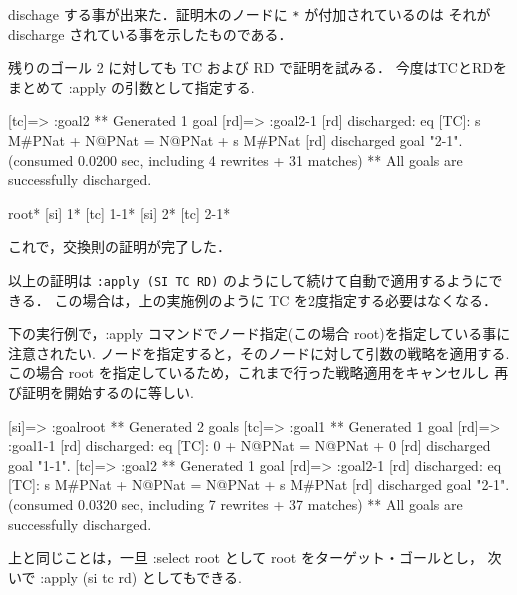 \documentclass[a4paper,oneside,10pt,here]{memoir}
\newenvironment{vvtm}%
{\parskip=0pt\lineskip=0pt\begin{center}\begin{minipage}{0.8\textwidth}\begin{snugshade}}%
  {\end{snugshade}\end{minipage}\end{center}}
\begin{document}
dischage する事が出来た．証明木のノードに \verb|*| が付加されているのは
それが discharge されている事を示したものである．

残りのゴール 2 に対しても TC および RD で証明を試みる．
今度はTCとRDをまとめて :apply の引数として指定する.
\begin{vvtm}
  \begin{simplev}

[tc]=> :goal{2}
** Generated 1 goal
[rd]=> :goal{2-1}
[rd] discharged: 
  eq [TC]: s M#PNat + N@PNat = N@PNat + s M#PNat
[rd] discharged goal "2-1".
(consumed 0.0200 sec, including 4 rewrites + 31 matches)
** All goals are successfully discharged.

root*
[si]  1*
[tc]  1-1*
[si]  2*
[tc]  2-1*
  \end{simplev}
\end{vvtm}
これで，交換則の証明が完了した．

以上の証明は \verb|:apply (SI TC RD)| のようにして続けて自動で適用するようにできる．
この場合は，上の実施例のように TC を2度指定する必要はなくなる．

下の実行例で，:apply コマンドでノード指定(この場合 root)を指定している事に注意されたい.
ノードを指定すると，そのノードに対して引数の戦略を適用する.
この場合 root を指定しているため，これまで行った戦略適用をキャンセルし
再び証明を開始するのに等しい.

\begin{vvtm}
  \begin{simplev}

[si]=> :goal{root}
** Generated 2 goals
[tc]=> :goal{1}
** Generated 1 goal
[rd]=> :goal{1-1}
[rd] discharged: 
  eq [TC]: 0 + N@PNat = N@PNat + 0
[rd] discharged goal "1-1".
[tc]=> :goal{2}
** Generated 1 goal
[rd]=> :goal{2-1}
[rd] discharged: 
  eq [TC]: s M#PNat + N@PNat = N@PNat + s M#PNat
[rd] discharged goal "2-1".
(consumed 0.0320 sec, including 7 rewrites + 37 matches)
** All goals are successfully discharged.
  \end{simplev}
\end{vvtm}

上と同じことは，一旦 :select root として root をターゲット・ゴールとし，
次いで :apply (si tc rd) としてもできる.
\end{document}
